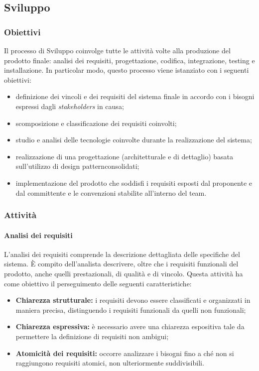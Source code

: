 \subsection{Sviluppo}
\subsubsection{Obiettivi}
Il processo di Sviluppo coinvolge tutte le attività volte alla produzione del prodotto finale: analisi dei requisiti,  progettazione, codifica, integrazione, testing e installazione. In particolar modo, questo processo viene istanziato con i seguenti obiettivi:
\begin{itemize}
	\item definizione dei vincoli e dei requisiti del sistema finale in accordo con i bisogni espressi dagli \textit{stakeholders\glo} in causa;
	\item scomposizione e classificazione dei requisiti coinvolti;
	\item studio e analisi delle tecnologie coinvolte durante la realizzazione del sistema;
	\item realizzazione di una progettazione (architetturale e di dettaglio) basata sull'utilizzo di design pattern\glo consolidati;
	\item implementazione del prodotto che soddisfi i requisiti esposti dal proponente e dal committente e le convenzioni stabilite all'interno del team.
\end{itemize}
\subsubsection{Attività}
\paragraph{Analisi dei requisiti}
L'analisi dei requisiti comprende la descrizione dettagliata delle specifiche del sistema. È compito dell'analista descrivere, oltre che i requisiti funzionali del prodotto, anche quelli prestazionali, di qualità e di vincolo. 
Questa attività ha come obiettivo il perseguimento delle seguenti caratteristiche:
\begin{itemize}
	\item \textbf{Chiarezza strutturale:} i requisiti devono essere classificati e organizzati in maniera precisa, distinguendo i requisiti funzionali da quelli non funzionali;
	\item \textbf{Chiarezza espressiva:} è necessario avere una chiarezza espositiva tale da permettere la definizione di requisiti non ambigui;
	\item \textbf{Atomicità dei requisiti:} occorre analizzare i bisogni fino a ché non si raggiungono requisiti atomici, non ulteriormente suddivisibili.  
\end{itemize}

